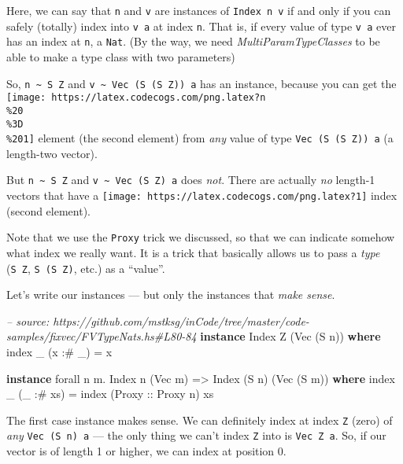 \documentclass[]{article}
\newenvironment{Shaded}{\begin{snugshade}}{\end{snugshade}}
\newcommand{\CommentTok}[1]{\textcolor[rgb]{0.56,0.35,0.01}{\textit{#1}}}
\newcommand{\DataTypeTok}[1]{\textcolor[rgb]{0.13,0.29,0.53}{#1}}
\newcommand{\FunctionTok}[1]{\textcolor[rgb]{0.00,0.00,0.00}{#1}}
\newcommand{\KeywordTok}[1]{\textcolor[rgb]{0.13,0.29,0.53}{\textbf{#1}}}
\newcommand{\NormalTok}[1]{#1}
\newcommand{\OtherTok}[1]{\textcolor[rgb]{0.56,0.35,0.01}{#1}}
\begin{document}
Here, we can say that \texttt{n} and \texttt{v} are instances of
\texttt{Index\ n\ v} if and only if you can safely (totally) index into
\texttt{v\ a} at index \texttt{n}. That is, if every value of type \texttt{v\ a}
ever has an index at \texttt{n}, a \texttt{Nat}. (By the way, we need
\emph{MultiParamTypeClasses} to be able to make a type class with two
parameters)

So, \texttt{n\ \textasciitilde{}\ S\ Z} and
\texttt{v\ \textasciitilde{}\ Vec\ (S\ (S\ Z))\ a} has an instance, because you
can get the
\texttt{[image: https://latex.codecogs.com/png.latex?n\\\%20\\\%3D\\\%201]} element
(the second element) from \emph{any} value of type \texttt{Vec\ (S\ (S\ Z))\ a}
(a length-two vector).

But \texttt{n\ \textasciitilde{}\ S\ Z} and
\texttt{v\ \textasciitilde{}\ Vec\ (S\ Z)\ a} does \emph{not}. There are
actually \emph{no} length-1 vectors that have a
\texttt{[image: https://latex.codecogs.com/png.latex?1]} index (second element).

Note that we use the \texttt{Proxy} trick we discussed, so that we can indicate
somehow what index we really want. It is a trick that basically allows us to
pass a \emph{type} (\texttt{S\ Z}, \texttt{S\ (S\ Z)}, etc.) as a ``value''.

Let's write our instances --- but only the instances that \emph{make sense}.

\begin{Shaded}
\begin{Highlighting}[]
\CommentTok{-- source: https://github.com/mstksg/inCode/tree/master/code-samples/fixvec/FVTypeNats.hs#L80-84}
\KeywordTok{instance} \DataTypeTok{Index} \DataTypeTok{Z}\NormalTok{ (}\DataTypeTok{Vec}\NormalTok{ (}\DataTypeTok{S}\NormalTok{ n)) }\KeywordTok{where}
\NormalTok{    index _ (x }\FunctionTok{:#}\NormalTok{ _) }\FunctionTok{=}\NormalTok{ x}

\KeywordTok{instance}\NormalTok{ forall n m}\FunctionTok{.} \DataTypeTok{Index}\NormalTok{ n (}\DataTypeTok{Vec}\NormalTok{ m) }\OtherTok{=>} \DataTypeTok{Index}\NormalTok{ (}\DataTypeTok{S}\NormalTok{ n) (}\DataTypeTok{Vec}\NormalTok{ (}\DataTypeTok{S}\NormalTok{ m)) }\KeywordTok{where}
\NormalTok{    index _ (_ }\FunctionTok{:#}\NormalTok{ xs) }\FunctionTok{=}\NormalTok{ index (}\DataTypeTok{Proxy}\OtherTok{ ::} \DataTypeTok{Proxy}\NormalTok{ n) xs}
\end{Highlighting}
\end{Shaded}

The first case instance makes sense. We can definitely index at index \texttt{Z}
(zero) of \emph{any} \texttt{Vec\ (S\ n)\ a} --- the only thing we can't index
\texttt{Z} into is \texttt{Vec\ Z\ a}. So, if our vector is of length 1 or
higher, we can index at position 0.
\end{document}
